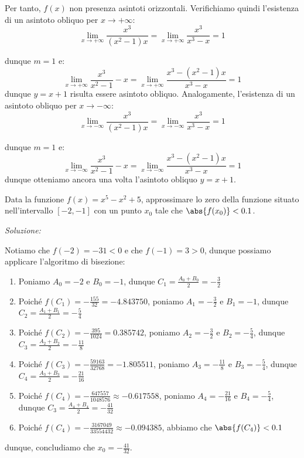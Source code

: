 \documentclass[a4paper, 12pt]{report}
\begin{document}
\begin{enumerate}
        Per tanto, $f(x)$ non presenza asintoti orizzontali. Verifichiamo quindi l'esistenza di un asintoto obliquo per $x \to +\infty$:
        \[\lim_{x \to +\infty} \dfrac{x^3}{(x^2-1)x} = \lim_{x \to +\infty} \dfrac{x^3}{x^3-x} = 1\]

        dunque $m = 1$ e:
        \[\lim_{x \to +\infty} \dfrac{x^3}{x^2-1} - x = \lim_{x \to +\infty} \dfrac{x^3-(x^2-1)x}{x^3-x} = 1\]
        dunque $y = x+1$ risulta essere asintoto obliquo. Analogamente, l'esistenza di un asintoto obliquo per $x \to -\infty$:
        \[\lim_{x \to -\infty} \dfrac{x^3}{(x^2-1)x} = \lim_{x \to -\infty} \dfrac{x^3}{x^3-x} = 1\]

        dunque $m = 1$ e:
        \[\lim_{x \to -\infty} \dfrac{x^3}{x^2-1} - x = \lim_{x \to -\infty} \dfrac{x^3-(x^2-1)x}{x^3-x} = 1\]
        dunque otteniamo ancora una volta l'asintoto obliquo $y = x+1$.
    \end{enumerate}

    \newpage

    \begin{framedprob}{}
        Data la funzione $f(x) = x^5 - x^2 + 5$, approssimare lo zero della funzione situato nell'intervallo $[-2,-1]$ con un punto $x_0$ tale che $\abs{f(x_0)} < 0.1$.
    \end{framedprob}

    \textit{Soluzione:}

    Notiamo che $f(-2) = -31 < 0$ e che $f(-1) = 3 > 0$, dunque possiamo applicare l'algoritmo di bisezione:
    \begin{enumerate}
        \item Poniamo $A_0 = -2$ e $B_0 = -1$, dunque $C_1 = \frac{A_0+B_0}{2} = -\frac{3}{2}$
        \item Poiché $f(C_1) = -\frac{155}{32} = -4.843750$, poniamo $A_1 = -\frac{3}{2}$ e $B_1 = -1$, dunque $C_2 = \frac{A_1+B_1}{2} = -\frac{5}{4}$
        \item Poiché $f(C_2) = -\frac{395}{1024} = 0.385742$, poniamo $A_2 = -\frac{3}{2}$ e $B_2 = -\frac{5}{4}$, dunque $C_3 = \frac{A_2+B_2}{2} = -\frac{11}{8}$
        \item Poiché $f(C_3) = -\frac{59163}{32768} = -1.805511$, poniamo $A_3 = -\frac{11}{8}$ e $B_3 = -\frac{5}{4}$, dunque $C_4 = \frac{A_3+B_3}{2} = -\frac{21}{16}$
        \item Poiché $f(C_4) = -\frac{647557}{1048576} \approx -0.617558$, poniamo $A_4 = -\frac{21}{16}$ e $B_4 = -\frac{5}{4}$, dunque $C_3 = \frac{A_4+B_4}{2} = -\frac{41}{32}$
        \item Poiché $f(C_4) = -\frac{3167049}{33554432} \approx -0.094385$, abbiamo che $\abs{f(C_4)} < 0.1$
    \end{enumerate}
    dunque, concludiamo che $x_0 = -\frac{41}{32}$.
\end{document}
